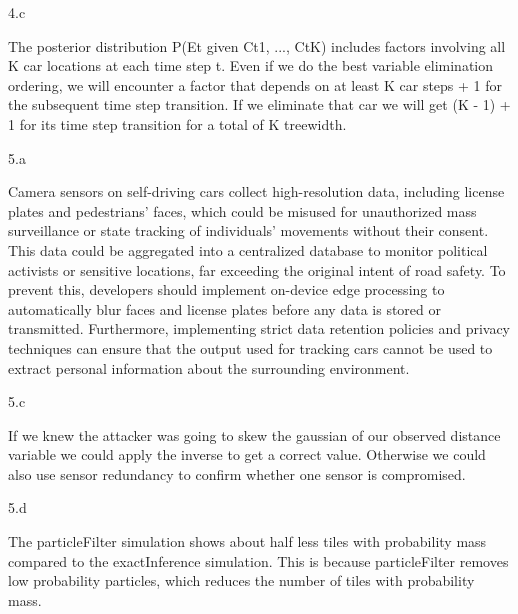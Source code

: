 \LARGE
4.c
\normalsize

\begin{answer}
  The posterior distribution P(Et given Ct1, ..., CtK) includes factors involving all K car locations at each time step t. Even if we do the best variable elimination ordering, we will encounter a factor that depends on at least K car steps + 1 for the subsequent time step transition. If we eliminate that car we will get (K - 1) + 1 for its time step transition for a total of K treewidth.
\end{answer}
\clearpage


\LARGE
5.a
\normalsize

\begin{answer}
  Camera sensors on self-driving cars collect high-resolution data, including license plates and pedestrians' faces, which could be misused for unauthorized mass surveillance or state tracking of individuals' movements without their consent. This data could be aggregated into a centralized database to monitor political activists or sensitive locations, far exceeding the original intent of road safety. To prevent this, developers should implement on-device edge processing to automatically blur faces and license plates before any data is stored or transmitted. Furthermore, implementing strict data retention policies and privacy techniques can ensure that the output used for tracking cars cannot be used to extract personal information about the surrounding environment.
\end{answer}
\clearpage

\LARGE
5.c
\normalsize

\begin{answer}
  If we knew the attacker was going to skew the gaussian of our observed distance variable we could apply the inverse to get a correct value. Otherwise we could also use sensor redundancy to confirm whether one sensor is compromised.
\end{answer}
\clearpage

\LARGE
5.d
\normalsize

\begin{answer}
  The particleFilter simulation shows about half less tiles with probability mass compared to the exactInference simulation. This is because particleFilter removes low probability particles, which reduces the number of tiles with probability mass.
\end{answer}
\clearpage

